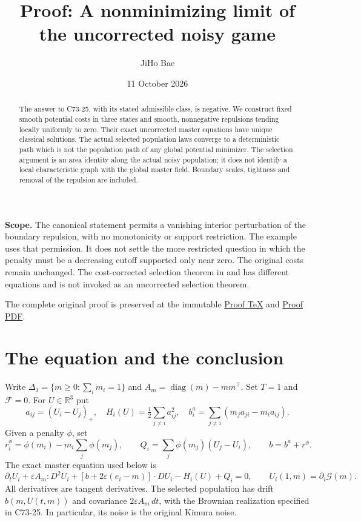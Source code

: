 \documentclass[11pt,a4paper]{article}
\title{Proof: A nonminimizing limit of the uncorrected noisy game}
\author{JiHo Bae}
\date{11 October 2026}
\newcommand{\R}{\mathbb R}
\newcommand{\F}{\mathcal F}
\newcommand{\G}{\mathcal G}
\newcommand{\dt}{\,dt}
\begin{document}
\maketitle
\begin{abstract}
The answer to C73-25, with its stated admissible class, is negative.
We construct fixed smooth potential costs in three states and smooth,
nonnegative repulsions tending locally uniformly to zero. Their exact
uncorrected master equations have unique classical solutions. The actual
selected population laws converge to a deterministic path which is not
the population path of any global potential minimizer. The selection
argument is an area identity along the actual noisy population; it does
not identify a local characteristic graph with the global master field.
Boundary scales, tightness and removal of the repulsion are included.
\end{abstract}

\textbf{Scope.} The canonical statement permits a vanishing interior
perturbation of the boundary repulsion, with no monotonicity or support
restriction. The example uses that permission. It does not settle the
more restricted question in which the penalty must be a decreasing
cutoff supported only near zero. The original costs remain unchanged.
The cost-corrected selection theorem in
\cite[Theorem 4.5, p.~3692]{CD} and \cite{CeD} has different
equations and is not invoked as an uncorrected selection theorem.

The complete original proof is preserved at the immutable
\href{https://github.com/jbaelaw/uncorrected-noise-nonminimizing-selection/blob/df1d03253a80b693cc7880155b0a3cf0a4c809e7/paper/Proof.tex}{Proof TeX}
and \href{https://github.com/jbaelaw/uncorrected-noise-nonminimizing-selection/blob/df1d03253a80b693cc7880155b0a3cf0a4c809e7/paper/Proof.pdf}{Proof PDF}.

\section{The equation and the conclusion}
Write $\Delta_3=\{m\geq0:\sum_i m_i=1\}$ and
$A_m=\operatorname{diag}(m)-mm^\top$. Set $T=1$ and $\F=0$.
For $U\in\R^3$ put
\[
 a_{ij}=(U_i-U_j)_+,
 \quad H_i(U)=\tfrac12\sum_{j\ne i}a_{ij}^2,
 \quad b_i^a=\sum_{j\ne i}(m_ja_{ji}-m_ia_{ij}).
\]
Given a penalty $\phi$, set
\[
 r_i^\phi=\phi(m_i)-m_i\sum_j\phi(m_j),\qquad
 Q_i=\sum_j\phi(m_j)(U_j-U_i),\qquad b=b^a+r^\phi.
\]
The exact master equation used below is
\begin{equation}\label{master}
 \partial_tU_i+\varepsilon A_m:D^2U_i
 +[b+2\varepsilon(e_i-m)]\cdot DU_i-H_i(U)+Q_i=0,
 \qquad U_i(1,m)=\partial_i\G(m).
\end{equation}
All derivatives are tangent derivatives. The selected population has
drift $b(m,U(t,m))$ and covariance $2\varepsilon A_m\dt$, with the
Brownian realization specified in C73-25. In particular, its noise is
the original Kimura noise.
\end{document}
